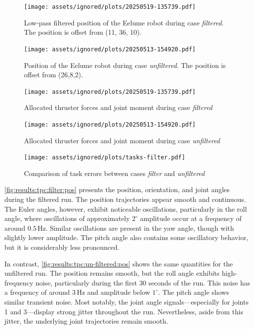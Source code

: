 \begin{figure}[h!]
    \centering
    \texttt{[image: assets/ignored/plots/20250519-135739.pdf]}
    \caption[Low-pass filtered position of the Eelume robot during case \textit{filtered}]{Low-pass filtered position of the Eelume robot during case \textit{filtered}. The position is offset from (11, 36, 10).}
    \label{fig:results:tpc:filter:pos}
\end{figure}
\begin{figure}[h!]
    \centering
    \texttt{[image: assets/ignored/plots/20250513-154920.pdf]}
    \caption[Position of the Eelume robot during case \textit{unfiltered}]{Position of the Eelume robot during case \textit{unfiltered}. The position is offset from (26,8,2).}
    \label{fig:results:tpc:un-filtered:pos}
\end{figure}
\begin{figure}[h!]
    \centering
    \texttt{[image: assets/ignored/plots/20250519-135739.pdf]}
    \caption{Allocated thruster forces and joint moment during case \textit{filtered}}
    \label{fig:results:tpc:filter:forces}
\end{figure}
\begin{figure}[h!]
    \centering
    \texttt{[image: assets/ignored/plots/20250513-154920.pdf]}
    \caption{Allocated thruster forces and joint moment during case \textit{unfiltered}}
    \label{fig:results:tpc:un-filtered:forces}
\end{figure}
\begin{figure}[h!]
    \centering
    \texttt{[image: assets/ignored/plots/tasks-filter.pdf]}
    \caption{Comparison of task errors between cases \textit{filter} and \textit{unfiltered}}
    \label{fig:results:tpc:filter:task-errors}
\end{figure}

\autoref{fig:results:tpc:filter:pos} presents the position, orientation, and joint angles during the filtered run. The position trajectories appear smooth and continuous. The Euler angles, however, exhibit noticeable oscillations, particularly in the roll angle, where oscillations of approximately \(2^\circ\) amplitude occur at a frequency of around \(0.5\,\mathrm{Hz}\). Similar oscillations are present in the yaw angle, though with slightly lower amplitude. The pitch angle also contains some oscillatory behavior, but it is considerably less pronounced.

In contrast, \autoref{fig:results:tpc:un-filtered:pos} shows the same quantities for the unfiltered run. The position remains smooth, but the roll angle exhibits high-frequency noise, particularly during the first 30 seconds of the run. This noise has a frequency of around \(3\,\mathrm{Hz}\) and amplitude below \(1^\circ\). The pitch angle shows similar transient noise. Most notably, the joint angle signals—especially for joints 1 and 3—display strong jitter throughout the run. Nevertheless, aside from this jitter, the underlying joint trajectories remain smooth.

